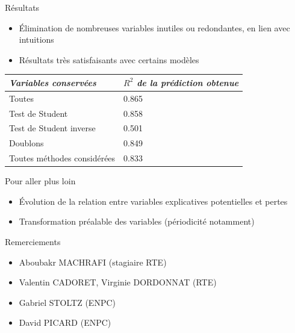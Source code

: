 \begin{frame}{Résultats}
\protect\hypertarget{ruxe9sultats}{}
\begin{itemize}
\tightlist
\item
  Élimination de nombreuses variables inutiles ou redondantes, en lien
  avec intuitions
\item
  Résultats très satisfaisants avec certains modèles
\end{itemize}

\begin{longtable}[]{@{}ll@{}}
\toprule
\emph{Variables conservées} & \emph{\(R^2\) de la prédiction
obtenue}\tabularnewline
\midrule
\endhead
Toutes & 0.865\tabularnewline
Test de Student & 0.858\tabularnewline
Test de Student inverse & 0.501\tabularnewline
Doublons & 0.849\tabularnewline
Toutes méthodes considérées & 0.833\tabularnewline
\bottomrule
\end{longtable}
\end{frame}

\begin{frame}{Pour aller plus loin}
\protect\hypertarget{pour-aller-plus-loin}{}
\begin{itemize}
\tightlist
\item
  Évolution de la relation entre variables explicatives potentielles et
  pertes
\item
  Transformation préalable des variables (périodicité notamment)
\end{itemize}
\end{frame}

\begin{frame}{Remerciements}
\protect\hypertarget{remerciements}{}
\begin{itemize}
\tightlist
\item
  Aboubakr MACHRAFI (stagiaire RTE)
\item
  Valentin CADORET, Virginie DORDONNAT (RTE)
\item
  Gabriel STOLTZ (ENPC)
\item
  David PICARD (ENPC)
\end{itemize}
\end{frame}
